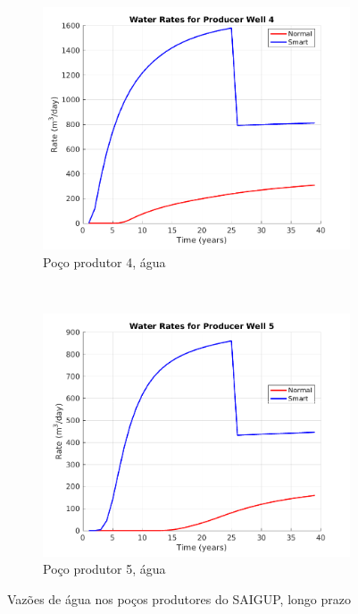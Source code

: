 \begin{figure}[!ht]
	\begin{subfigure}[b]{.3\textwidth}
		\includegraphics[width=\textwidth]{figs/resultadosLSAIGUP/LSAIGUP_WaterWell4_Zoom}
		\caption{Po\c{c}o produtor 4, \'{a}gua}
		\label{LSAIGUP_WaterWell4}
	\end{subfigure}
	~
	\begin{subfigure}[b]{.3\textwidth}
		\includegraphics[width=\textwidth]{figs/resultadosLSAIGUP/LSAIGUP_WaterWell5_Zoom}
		\caption{Po\c{c}o produtor 5, \'{a}gua}
		\label{LSAIGUP_WaterWell5}
	\end{subfigure}
	\caption{Vaz\~{o}es de \'{a}gua nos po\c{c}os produtores do SAIGUP, longo prazo}
	\label{LSAIGUP_WaterRates}
\end{figure}
